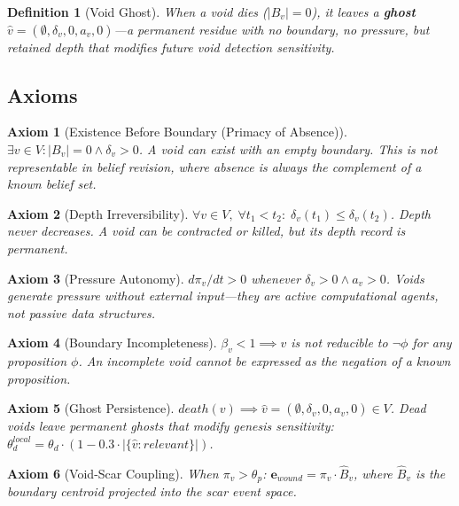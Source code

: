 \documentclass[11pt]{article}
\newtheorem{definition}[theorem]{Definition}
\newtheorem{axiom}{Axiom}[section]
\begin{document}
\begin{definition}[Void Ghost]
\label{def:ghost}
When a void dies ($|B_v| = 0$), it leaves a \textbf{ghost} $\hat{v} = (\emptyset, \delta_v, 0, a_v, 0)$---a permanent residue with no boundary, no pressure, but retained depth that modifies future void detection sensitivity.
\end{definition}

\subsection{Axioms}

\begin{axiom}[Existence Before Boundary (Primacy of Absence)]
\label{ax:void-primacy}
$\exists v \in V: |B_v| = 0 \wedge \delta_v > 0$. A void can exist with an empty boundary. This is not representable in belief revision, where absence is always the complement of a known belief set.
\end{axiom}

\begin{axiom}[Depth Irreversibility]
\label{ax:void-depth}
$\forall v \in V,\; \forall t_1 < t_2:\; \delta_v(t_1) \leq \delta_v(t_2)$. Depth never decreases. A void can be contracted or killed, but its depth record is permanent.
\end{axiom}

\begin{axiom}[Pressure Autonomy]
\label{ax:void-pressure}
$d\pi_v/dt > 0$ whenever $\delta_v > 0 \wedge a_v > 0$. Voids generate pressure without external input---they are active computational agents, not passive data structures.
\end{axiom}

\begin{axiom}[Boundary Incompleteness]
\label{ax:void-incomplete}
$\beta_v < 1 \implies v$ is not reducible to $\neg\phi$ for any proposition $\phi$. An incomplete void cannot be expressed as the negation of a known proposition.
\end{axiom}

\begin{axiom}[Ghost Persistence]
\label{ax:void-ghost}
$death(v) \implies \hat{v} = (\emptyset, \delta_v, 0, a_v, 0) \in V$. Dead voids leave permanent ghosts that modify genesis sensitivity: $\theta_d^{local} = \theta_d \cdot (1 - 0.3 \cdot |\{\hat{v}: relevant\}|)$.
\end{axiom}

\begin{axiom}[Void-Scar Coupling]
\label{ax:void-coupling}
When $\pi_v > \theta_p$: $\mathbf{e}_{wound} = \pi_v \cdot \hat{B}_v$, where $\hat{B}_v$ is the boundary centroid projected into the scar event space.
\end{axiom}
\end{document}
